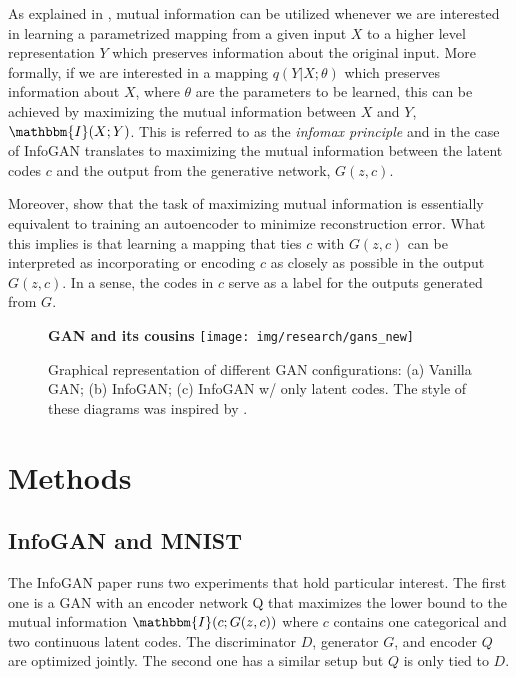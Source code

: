 \documentclass{article}
\newcommand{\I}{\mathbbm{I}}
\begin{document}
As explained in \cite{VincentBengioStackedAE}, mutual information can be utilized whenever we are interested in learning a parametrized mapping from a given input $X$ to a higher level representation $Y$ which preserves information about the original input. More formally, if we are interested in a mapping $q(Y|X;\theta)$ which preserves information about $X$, where $\theta$ are the parameters to be learned, this can be achieved by maximizing the mutual information between $X$ and $Y$, $\I(X;Y)$. This is referred to as the \textit{infomax principle} and in the case of InfoGAN translates to maximizing the mutual information between the latent codes $c$ and the output from the generative network, $G(z,c)$. 

Moreover, \cite{VincentBengioStackedAE} show that the task of maximizing mutual information is essentially equivalent to training an autoencoder to minimize reconstruction error. What this implies is that learning a mapping that ties $c$ with $G(z,c)$ can be interpreted as incorporating or encoding $c$ as closely as possible in the output $G(z,c)$. In a sense, 
the codes in $c$ serve as a label for the outputs generated from $G$.

\begin{figure}[ht]
\centering \textbf{GAN and its cousins}
\texttt{[image: img/research/gans\_new]}
\caption{Graphical representation of different GAN configurations: (a) Vanilla GAN; (b) InfoGAN; (c) InfoGAN w/ only latent codes. The style of these diagrams was inspired by \cite{odena2016conditional}. %
}
\label{graphicalGAN}
\end{figure}
\section{Methods}

\subsection{InfoGAN and MNIST}

The InfoGAN paper runs two experiments that hold particular interest. The first one is a GAN with an encoder network Q that maximizes the lower bound to the mutual information $\I(c;G(z,c))$ where $c$ contains one categorical and two continuous latent codes. The discriminator $D$, generator $G$, and encoder $Q$ are optimized jointly. The second one has a similar setup but $Q$ is only tied to $D$.
\end{document}
